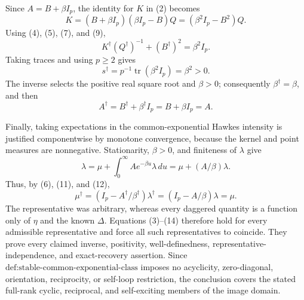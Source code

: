 Since \(A=B+\beta I_p\), the identity for \(K\) in (2) becomes
\[
 K=(B+\beta I_p)(\beta I_p-B)Q=(\beta^2I_p-B^2)Q.
\tag{9}
\]
Using (4), (5), (7), and (9),
\[
 K^\dagger(Q^\dagger)^{-1}+(B^\dagger)^2=\beta^2I_p.
\tag{10}
\]
Taking traces and using \(p\geq2\) gives
\[
 s^\dagger=p^{-1}\operatorname{tr}(\beta^2I_p)=\beta^2>0.
\tag{11}
\]
The inverse selects the positive real square root and \(\beta>0\); consequently \(\beta^\dagger=\beta\), and then
\[
 A^\dagger=B^\dagger+\beta^\dagger I_p=B+\beta I_p=A.
\tag{12}
\]

Finally, taking expectations in the common-exponential Hawkes intensity is justified componentwise by monotone convergence, because the kernel and point measures are nonnegative.  Stationarity, \(\beta>0\), and finiteness of \(\lambda\) give
\[
 \lambda=\mu+\int_0^\infty Ae^{-\beta u}\lambda\,du
 =\mu+(A/\beta)\lambda.
\tag{13}
\]
Thus, by (6), (11), and (12),
\[
 \mu^\dagger=(I_p-A^\dagger/\beta^\dagger)\lambda^\dagger
 =(I_p-A/\beta)\lambda=\mu.
\tag{14}
\]
The representative was arbitrary, whereas every daggered quantity is a function only of \(\eta\) and the known \(\Delta\).  Equations (3)--(14) therefore hold for every admissible representative and force all such representatives to coincide.  They prove every claimed inverse, positivity, well-definedness, representative-independence, and exact-recovery assertion.  Since \(\text{def:stable-common-exponential-class}\) imposes no acyclicity, zero-diagonal, orientation, reciprocity, or self-loop restriction, the conclusion covers the stated full-rank cyclic, reciprocal, and self-exciting members of the image domain.